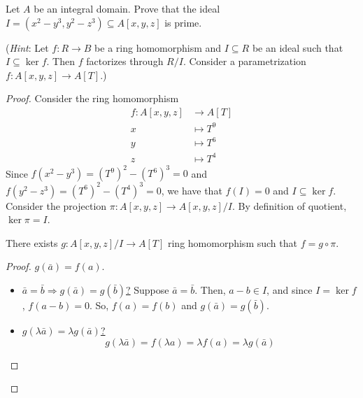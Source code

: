 \begin{problem}
    Let $A$ be an integral domain.
    Prove that the ideal $I = (x^2 - y^3, y^2 - z^3) \subseteq A[x,y,z]$ is prime.

    (\textit{Hint}: Let $f:R \rightarrow B$ be a ring homomorphism and $I \subseteq R$ be an ideal such that $I \subseteq \ker f$.
    Then $f$ factorizes through $R/I$.
    Consider a parametrization $f: A[x,y,z] \rightarrow A[T]$.)
    \begin{sol}
        \begin{proof}
            Consider the ring homomorphism
            \begin{align*}
            f \colon A[x,y,z] & \longrightarrow A[T]\\
            x&\longmapsto T^9\\
            y&\longmapsto T^6\\
            z&\longmapsto T^4
            \end{align*}
            Since $f(x^2 - y^3) = (T^9)^2 - (T^6)^3 = 0$ and $f(y^2 - z^3) = (T^6)^2 - (T^4)^3 = 0$, we have that $f(I) = 0$ and $I \subseteq \ker f$.
            Consider the projection $\pi: A[x,y,z] \rightarrow A[x,y,z]/I$.
            By definition of quotient, $\ker \pi = I$.
            \begin{claim}
                There exists $g: A[x,y,z]/I \rightarrow A[T]$ ring homomorphism such that $f = g \circ \pi$.
                \begin{proof}
                    $g(\bar{a}) = f(a)$.
                    \begin{itemize}
                        \item
                        \underline{$\bar{a} = \bar{b} \Rightarrow g(\bar{a}) = g(\bar{b})$?} \newline
                        Suppose $\bar{a} = \bar{b}$.
                        Then, $a - b \in I$, and since $I = \ker f$, $f(a - b) = 0$.
                        So, $f(a) = f(b)$ and $g(\bar{a}) = g(\bar{b})$.

                        \item
                        \underline{$g(\lambda \bar{a}) = \lambda g(\bar{a})$?}
                        \[ g(\lambda \bar{a}) = f(\lambda a) = \lambda f(a) = \lambda g(\bar{a}) \]


\end{itemize}
\end{proof}
\end{claim}
\end{proof}
\end{sol}
\end{problem}
